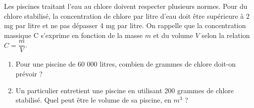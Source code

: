 {%
\begin{Exercice}
Les piscines traitant l'eau au chlore doivent respecter plusieurs normes. Pour du chlore stabilisé, la concentration de chlore par litre d'eau doit être supérieure à 2 mg par litre et ne pas dépasser 4 mg par litre. On rappelle que la concentration massique C s'exprime en fonction de la masse $ m $ et du volume $ V $ selon la relation $ C=\dfrac{m}{V} $.
\begin{enumerate}


\item Pour une piscine de 60 000 litres, combien de grammes de chlore doit-on prévoir ?
\item Un particulier entretient une piscine en utilisant 200 grammes de chlore stabilisé. Quel peut être le volume de sa piscine, en $ m^3 $ ?
\end{enumerate}
\end{Exercice}
}
